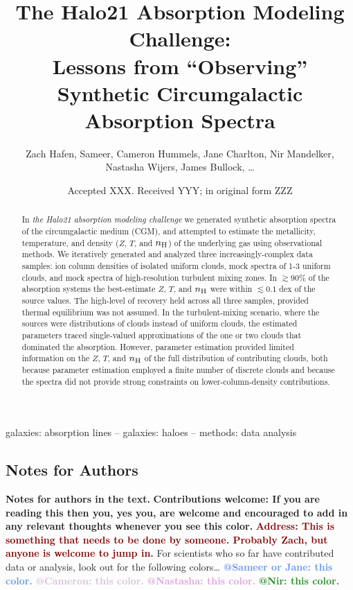 \documentclass[fleqn,usenatbib]{mnras}
\title[``Observing'' Synthetic Circumgalactic Absorption Spectra]{The Halo21 Absorption Modeling Challenge:\\Lessons from ``Observing'' Synthetic Circumgalactic Absorption Spectra}
\author[]{
Zach Hafen,
Sameer,
Cameron Hummels,
Jane Charlton,
Nir Mandelker,
Nastasha Wijers,
James Bullock,
\ldots
\\
}
\date{Accepted XXX. Received YYY; in original form ZZZ}
\makeatletter
\newcommand{\thoughts}[1]{\textcolor{BurntOrange}{\textbf{Contributions welcome: #1}}}
\newcommand{\todo}[1]{\textcolor{Maroon}{\textbf{Address: #1}}}
\newcommand{\atsameer}[1]{\textcolor{CornflowerBlue}{\textbf{@Sameer or Jane: #1}}}
\newcommand{\atcameron}[1]{\textcolor{Thistle}{\textbf{@Cameron: #1}}}
\newcommand{\atnastasha}[1]{\textcolor{Plum}{\textbf{@Nastasha: #1}}}
\newcommand{\atnir}[1]{\textcolor{ForestGreen}{\textbf{@Nir: #1}}}
\makeatother
\begin{document}
\label{firstpage}
\pagerange{\pageref{firstpage}--\pageref{lastpage}}
\maketitle

\begin{abstract}
In \textit{the Halo21 absorption modeling challenge} we generated synthetic absorption spectra of the circumgalactic medium (CGM),
and attempted to estimate the metallicity, temperature, and density ($Z$, $T$, and $n_{\rm H}$) of the underlying gas using observational methods.
We iteratively generated and analyzed three increasingly-complex data samples:
ion column densities of isolated uniform clouds,
mock spectra of 1-3 uniform clouds,
and mock spectra of high-resolution turbulent mixing zones.
In $\gtrsim 90\%$ of the absorption systems the best-estimate $Z$, $T$, and $n_{\rm H}$ were within $\lesssim0.1$ dex of the source values.
The high-level of recovery held across all three samples, provided thermal equilibrium was not assumed.
In the turbulent-mixing scenario, where the sources were distributions of clouds instead of uniform clouds, the estimated parameters traced single-valued approximations of the one or two clouds that dominated the absorption.
However, parameter estimation provided limited information on the $Z$, $T$, and $n_{\rm H}$ of the full distribution of contributing clouds,
both because parameter estimation employed a finite number of discrete clouds
and because the spectra did not provide strong constraints on lower-column-density contributions.
\end{abstract}

\begin{keywords}
galaxies: absorption lines -- galaxies: haloes -- methods: data analysis
\end{keywords}



\subsection{Notes for Authors}
 
\textbf{Notes for authors in the text.}
\thoughts{If you are reading this then you, yes you, are welcome and encouraged to add in any relevant thoughts whenever you see this color.}
\todo{This is something that needs to be done by someone. Probably Zach, but anyone is welcome to jump in.}
For scientists who so far have contributed data or analysis, look out for the following colors\ldots
\atsameer{this color.}
\atcameron{this color.}
\atnastasha{this color.}
\atnir{this color.}
\end{document}
